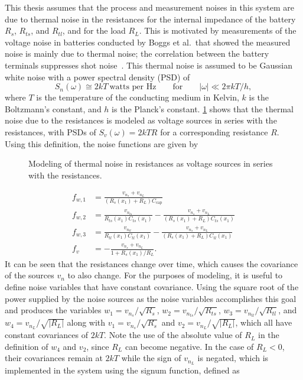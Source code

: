 \documentclass[../zhang_thesis.tex]{subfiles}
\begin{document}
This thesis assumes that the process and measurement noises in this system are due to thermal noise in the resistances for the internal impedance of the battery $R_s$, $R_{ts}$, and $R_{tl}$, and for the load $R_L$. This is motivated by measurements of the voltage noise in batteries conducted by Boggs et al.\ that showed the measured noise is mainly due to thermal noise; the correlation between the battery terminals suppresses shot noise~\cite{boggs95}. This thermal noise is assumed to
be Gaussian white noise with a power spectral density (PSD) of~\cite{stremler82}
\begin{equation}
    S_n(\omega) \cong 2kT\ \text{watts per Hz} \qquad \text{for} \qquad |\omega| \ll 2\pi kT/h,
\end{equation}
where $T$ is the temperature of the conducting medium in Kelvin, $k$ is the Boltzmann's constant, and $h$ is the Planck's constant. \cref{fig:batt_noisy} shows that the thermal noise due to the resistances is modeled as voltage sources in series with the resistances, with PSDs of $S_v(\omega)=2kTR$ for a corresponding resistance $R$. Using this definition, the noise functions are given by
\begin{figure}[tb]

\caption{Modeling of thermal noise in resistances as voltage sources in series with the resistances.}
\label{fig:batt_noisy}
\end{figure}
\begin{align}
    f_{w,1} &= \frac{v_{n_s}+v_{n_L}}{(R_s(x_1)+R_L)C_\text{cap}} \\
    f_{w,2} &= \frac{v_{n_{ts}}}{R_{ts}(x_1)C_{ts}(x_1)} - \frac{v_{n_s}+v_{n_L}}{(R_s(x_1)+R_L)C_{ts}(x_1)} \\
    f_{w,3} &= \frac{v_{n_{tl}}}{R_{tl}(x_1)C_{tl}(x_1)} - \frac{v_{n_s}+v_{n_L}}{(R_s(x_1)+R_L)C_{tl}(x_1)} \\
    f_v &= - \frac{v_{n_s}+v_{n_L}}{1+R_s(x_1)/R_L}.
\end{align}
It can be seen that the resistances change over time, which causes the covariance of the sources $v_n$ to also change. For the purposes of modeling, it is useful to define noise variables that have constant covariance. Using the square root of the power supplied by the noise sources as the noise variables accomplishes this goal and produces the variables $w_1=v_{n_s}/\sqrt{R_s}$, $w_2=v_{n_{ts}}/\sqrt{R_{ts}}$, $w_3=v_{n_{tl}}/\sqrt{R_{tl}}$, and $w_4=v_{n_L}/\sqrt{|R_L|}$ along with
$v_1=v_{n_s}/\sqrt{R_s}$ and $v_2=v_{n_L}/\sqrt{|R_L|}$, which all have
constant covariances of $2kT$. Note the use of the absolute value of $R_L$ in the definition of $w_4$ and $v_2$, since $R_L$ can become negative. In the case of $R_L<0$, their covariances remain at $2kT$ while the sign of $v_{n_L}$ is negated, which is implemented in the system using the signum function, defined as
\end{document}
